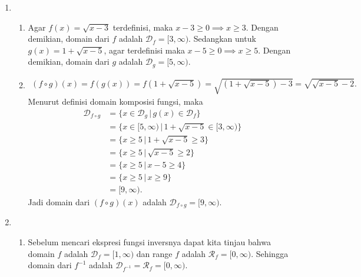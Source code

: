 \documentclass[11pt,openany,a4paper]{article}
\begin{document}
\begin{enumerate}
    \item \begin{enumerate}
              \item Agar $f(x) = \sqrt{x - 3}$ terdefinisi, maka $x - 3 \geq 0 \implies x \geq 3$. Dengan demikian, domain dari $f$ adalah $\mathcal{D}_f = [3,\infty)$. Sedangkan untuk $g(x) = 1 + \sqrt{x - 5}$, agar terdefinisi maka $x - 5 \geq 0 \implies x \geq 5$. Dengan demikian, domain dari $g$ adalah $\mathcal{D}_g = [5,\infty)$.
              \item \begin{align*}
                        (f \circ g)(x)  = f(g(x))
                        = f(1 + \sqrt{x - 5})
                        = \sqrt{(1 + \sqrt{x - 5}) - 3}
                        = \sqrt{\sqrt{x - 5} - 2}.
                    \end{align*}
                    Menurut definisi domain komposisi fungsi, maka
                    \begin{align*}
                        \mathcal{D}_{f \circ g} & = \{x \in \mathcal{D}_g \,|\, g(x) \in \mathcal{D}_f\}       \\
                                                & = \{x \in [5,\infty) \,|\, 1 + \sqrt{x - 5} \in [3,\infty)\} \\
                                                & = \{x \geq 5 \,|\, 1 + \sqrt{x - 5} \geq 3\}                 \\
                                                & = \{x \geq 5 \,|\, \sqrt{x - 5} \geq 2\}                     \\
                                                & = \{x \geq 5 \,|\, x - 5 \geq 4\}                            \\
                                                & = \{x \geq 5 \,|\, x \geq 9\}                                \\
                                                & = [9,\infty).
                    \end{align*}
                    Jadi domain dari $(f \circ g)(x)$ adalah $\mathcal{D}_{f \circ g} = [9,\infty)$.
          \end{enumerate}
    \item \begin{enumerate}
              \item Sebelum mencari ekspresi fungsi inversnya dapat kita tinjau bahwa domain $f$ adalah $\mathcal{D}_f = [1,\infty)$ dan range $f$ adalah $\mathcal{R}_f = [0,\infty)$. Sehingga domain dari $f^{-1}$ adalah $\mathcal{D}_{f^{-1}} = \mathcal{R}_f = [0,\infty)$.

\end{enumerate}
\end{enumerate}
\end{document}
